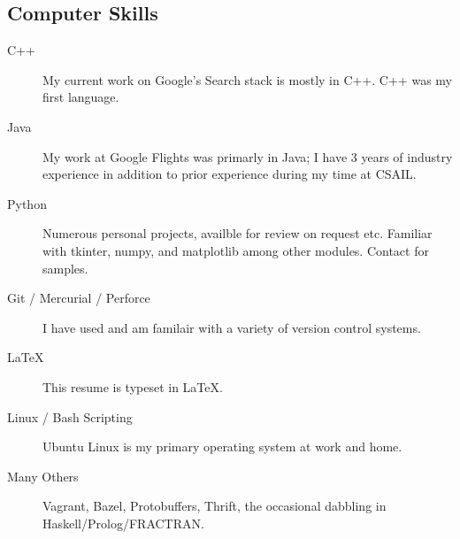 \documentclass{res}
\begin{document}
\begin{resume}
		\section{Computer Skills}

			\begin{description}

				\item[C++] My current work on Google's Search stack is mostly in C++. C++ was my first language.

				\item[Java] My work at Google Flights was primarly in Java; I have 3 years of industry experience in addition to prior experience during my time at CSAIL.

				\item[Python] Numerous personal projects, availble for review on request etc. Familiar with tkinter, numpy, and matplotlib among other modules. Contact for samples.

				\item[Git / Mercurial / Perforce] I have used and am familair with a variety of version control systems.

				\item[\LaTeX] This resume is typeset in \LaTeX.

				\item[Linux / Bash Scripting] Ubuntu Linux is my primary operating system at work and home.

				\item[Many Others] Vagrant, Bazel, Protobuffers, Thrift, the occasional dabbling in Haskell/Prolog/FRACTRAN.

			\end{description}
	\end{resume}
\end{document}
